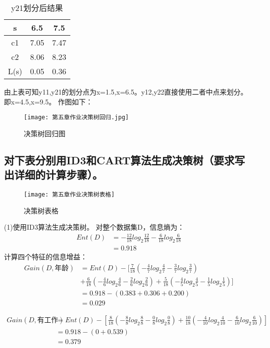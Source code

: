 \documentclass{ctexart}
\begin{document}
\begin{table}[H]
	\centering
	\begin{tabular}{|c|c|c|}
	\hline
	s&6.5&7.5\\
	\hline
	c1&7.05&7.47\\
	\hline
	c2&8.06&8.23\\
	\hline
	L(s)&0.05&0.36\\
	\hline
	\end{tabular}
	\caption{y21划分后结果}
\end{table}
由上表可知y11,y21的划分点为x=1.5,x=6.5。y12,y22直接使用二者中点来划分。即x=4.5,x=9.5。
作图如下：
\begin{figure}[H]
\texttt{[image: 第五章作业决策树回归.jpg]}
\caption{决策树回归图}
\end{figure}
\newpage
\subsection*{对下表分别用ID3和CART算法生成决策树（要求写出详细的计算步骤）。}
\begin{figure}[H]
\texttt{[image: 第五章作业决策树表格]}
\caption{决策树表格}
\end{figure}
(1)使用ID3算法生成决策树。
对整个数据集D，信息熵为：
\begin{align*}%
Ent(D)&=-\frac{12}{18}log_2\frac{12}{18}-\frac{6}{18}log_2\frac{6}{18}\\
 &=0.918
\end{align*}
计算四个特征的信息增益：
\begin{align*}
Gain(D,\mbox{年龄})&=Ent(D)-[\frac{7}{18}(-\frac{4}{7}log_2\frac{4}{7}-\frac{3}{7}log_2\frac{3}{7})\\&+\frac{6}{18}(-\frac{4}{6}log_2\frac{4}{6}-\frac{2}{6}log_2\frac{2}{6})+\frac{5}{18}(-\frac{4}{5}log_2\frac{4}{5}-\frac{1}{5}log_2\frac{1}{5})]\\
&=0.918-(0.383+0.306+0.200)\\
&=0.029
\end{align*}

\begin{align*}
Gain(D,\mbox{有工作})&=Ent(D)-[\frac{8}{18}(-\frac{8}{8}log_2\frac{8}{8}-\frac{0}{8}log_2\frac{0}{8})+\frac{10}{18}(-\frac{4}{10}log_2\frac{4}{10}-\frac{6}{10}log_2\frac{6}{10})]\\
&=0.918-(0+0.539)\\
&=0.379
\end{align*}
\end{document}
